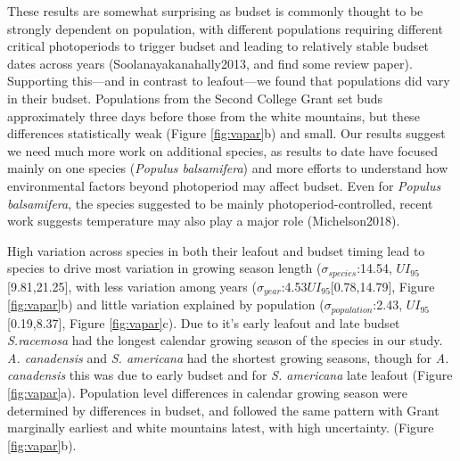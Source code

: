 \documentclass{article}[12pt]
\begin{document}
These results are somewhat surprising as budset is commonly thought to be strongly dependent on population, with different populations requiring different critical photoperiods to trigger budset and leading to relatively stable budset dates across years (Soolanayakanahally2013, and find some review paper). Supporting this---and in contrast to leafout---we found that populations did vary in their budset. Populations from the Second College Grant set buds approximately three days before those from the white mountains, but these differences statistically weak (Figure \ref{fig:vapar}b) and small. Our results suggest we need much more work on additional species, as results to date have focused mainly on one species (\emph{Populus balsamifera}) and more efforts to understand how environmental factors beyond photoperiod may affect budset. Even for \emph{Populus balsamifera}, the species suggested to be mainly photoperiod-controlled, recent work suggests temperature may also play a major role (Michelson2018).   


High variation across species in both their leafout and budset timing lead to species to drive most variation in  growing season length  ($\sigma_{species}$:14.54, $UI_{95}$[9.81,21.25], with less variation among years ($\sigma_{year}$:4.53$UI_{95}$[0.78,14.79], Figure \ref{fig:vapar}b) and little variation explained by population ($\sigma_{population}$:2.43, $UI_{95}$[0.19,8.37], Figure \ref{fig:vapar}c). Due to it's early leafout and late budset \emph{S.racemosa} had the longest calendar growing season of the species in our study. \emph{A. canadensis} and \emph{S. americana} had the shortest growing seasons, though for \emph{A. canadensis} this was due to early budset and for \emph{S. americana} late leafout (Figure \ref{fig:vapar}a). Population level differences in calendar growing season were determined by differences in budset, and followed the same pattern with Grant marginally earliest and white mountains  latest, with high uncertainty. (Figure \ref{fig:vapar}b). 
\end{document}
